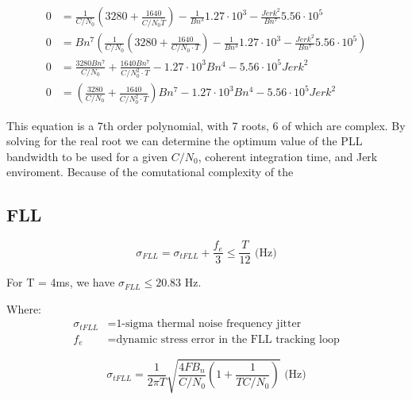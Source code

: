 \begin{align*}
0&=\frac{1}{C/N_0} \left(3280 + \frac{1640}{C/N_0 \dot T}\right) - \frac{1}{Bn^{3}} 1.27 \cdot 10^{3} - \frac{Jerk^{2}}{Bn^{7}} 5.56 \cdot 10^{5}\\
0&=Bn^{7} \left(\frac{1}{C/N_0} \left(3280 + \frac{1640}{C/N_0 \cdot T}\right) - \frac{1}{Bn^{3}} 1.27 \cdot 10^{3} - \frac{Jerk^{2}}{Bn^{7}} 5.56 \cdot 10^{5}\right)\\
0&=\frac{3280 Bn^{7}}{C/N_0} + \frac{1640 Bn^{7}}{C/N_0^{2} \cdot T} - 1.27 \cdot 10^{3} Bn^{4} - 5.56 \cdot 10^{5} Jerk^{2}\\
0&=(\frac{3280}{C/N_0} + \frac{1640}{C/N_0^{2} \cdot T})Bn^{7}  - 1.27 \cdot 10^{3} Bn^{4} - 5.56 \cdot 10^{5} Jerk^{2}
\end{align*}

This equation is a 7th order polynomial, with 7 roots, 6 of which are complex. By solving for the real root we can determine the optimum value of the PLL bandwidth to be used for a given $C/N_0$, coherent integration time, and Jerk enviroment. Because of the comutational complexity of the  

\subsection{FLL}


\begin{comment}
Talk about this
5.6.2 FLL Tracking Loop Measurement Errors

Generate figure 5.24
Generate figure 5.25

Also talk about section 5.6.2
\end{comment}

\begin{equation}\label{eq:FLLJitter}
\sigma_{FLL} =  \sigma_{tFLL} + \frac{f_e}{3} \leq \frac{T}{12} \text{ (Hz)}
\end{equation}

For T = 4ms, we have $\sigma_{FLL} \leq 20.83$ Hz.

Where:
\begin{align*}
\sigma_{tFLL} &= \text{1-sigma thermal noise frequency jitter}\\
f_e &= \text{dynamic stress error in the FLL tracking loop}
\end{align*}


\begin{equation}
\sigma_{tFLL} = \frac{1}{2 \pi T} \sqrt{ \frac{4FB_n}{C/N_0}(1 + \frac{1}{TC/N_0})} \text{ (Hz)}
\end{equation}

